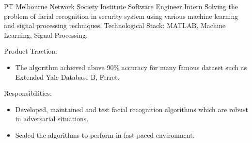 \documentclass[12pt]{article} %
\begin{document}
\begin{paracol}{2}
{PT} %
{Melbourne Network Society Institute}
{Software Engineer Intern} %
{Solving the problem of facial recognition in security system using various machine learning and signal processing techniques.} 
{Technological Stack: MATLAB, Machine Learning, Signal Processing.} %
{Product Traction:
	\begin{itemize}
		\item The algorithm achieved above 90\% accuracy for many famous dataset such as Extended Yale Database B, Ferret.   
	\end{itemize}}
{Responsibilities:
	\begin{itemize}
		\setlength{\itemsep}{1pt}	
		\item Developed, maintained and test facial recognition algorithms which are robust in adversarial situations.
		\item Scaled the algorithms to perform in fast paced environment.   
	\end{itemize}}












\end{paracol}
\end{document}
